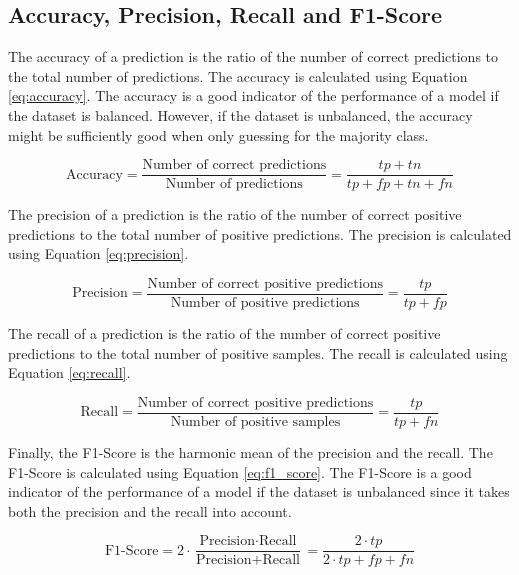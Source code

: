 \subsection{Accuracy, Precision, Recall and F1-Score}

The accuracy of a prediction is the ratio of the number of correct predictions to the total number of predictions. The accuracy is calculated using Equation \ref{eq:accuracy}. The accuracy is a good indicator of the performance of a model if the dataset is balanced. However, if the dataset is unbalanced, the accuracy might be sufficiently good when only guessing for the majority class. 

\begin{equation}
    \label{eq:accuracy}
    \text{Accuracy} = \frac{\text{Number of correct predictions}}{\text{Number of predictions}} = \frac{tp + tn}{tp + fp + tn + fn}
\end{equation}

The precision of a prediction is the ratio of the number of correct positive predictions to the total number of positive predictions. The precision is calculated using Equation \ref{eq:precision}.

\begin{equation}
    \label{eq:precision}
    \text{Precision} = \frac{\text{Number of correct positive predictions}}{\text{Number of positive predictions}} = \frac{tp}{tp + fp}
\end{equation}

The recall of a prediction is the ratio of the number of correct positive predictions to the total number of positive samples. The recall is calculated using Equation \ref{eq:recall}.

\begin{equation}
    \label{eq:recall}
    \text{Recall} = \frac{\text{Number of correct positive predictions}}{\text{Number of positive samples}} = \frac{tp}{tp + fn}
\end{equation}

Finally, the F1-Score is the harmonic mean of the precision and the recall. The F1-Score is calculated using Equation \ref{eq:f1_score}. The F1-Score is a good indicator of the performance of a model if the dataset is unbalanced since it takes both the precision and the recall into account.

\begin{equation}
    \label{eq:f1_score}
    \text{F1-Score} = 2 \cdot \frac{\text{Precision} \cdot \text{Recall}}{\text{Precision} + \text{Recall}} = \frac{2 \cdot tp}{2 \cdot tp + fp + fn}
\end{equation}

